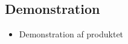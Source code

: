 \begin{frame}
\section{Demonstration}
\begin{itemize}
\item Demonstration af produktet
\end{itemize}
\end{frame}